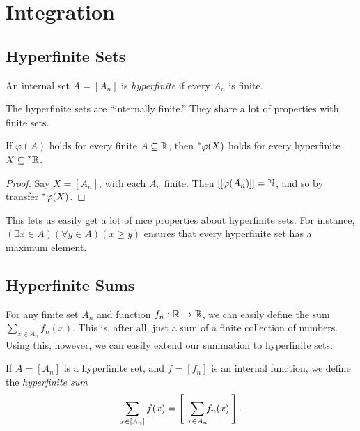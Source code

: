 \section{Integration}
\subsection{Hyperfinite Sets}
\begin{defn}
    An internal set $A = [A_n]$ is \textit{hyperfinite} if every $A_n$ is finite.
\end{defn}

The hyperfinite sets are ``internally finite.'' They share a lot of properties with finite sets.

\begin{thm}\label{HyperfiniteTransfer}
    If $\varphi(A)$ holds for every finite $A \subseteq \mathbb{R}$, then $\prescript{*}{}{\varphi}(X)$ holds for every hyperfinite $X \subseteq \prescript{*}{}{\mathbb{R}}$.
\end{thm}

\begin{proof}
    Say $X = [A_n]$, with each $A_n$ finite. Then $[[\varphi(A_n)]] = \mathbb{N}$, and so by transfer $\prescript{*}{}{\varphi}(X)$.
\end{proof}

This lets us easily get a lot of nice properties about hyperfinite sets. For instance, $(\exists x \in A)(\forall y \in A) (x \geq y)$ ensures that every hyperfinite set has a maximum element.

\subsection{Hyperfinite Sums}
For any finite set $A_n$ and function $f_n: \mathbb{R} \to \mathbb{R}$, we can easily define the sum $\sum_{x \in A_n} f_n(x)$. This is, after all, just a sum of a finite collection of numbers. Using this, however, we can easily extend our summation to hyperfinite sets:

\begin{defn}
    If $A = [A_n]$ is a hyperfinite set, and $f = [f_n]$ is an internal function, we define the \textit{hyperfinite sum}
    \[
    \sum_{x \in [A_n]} f(x) = \left[\ \ \sum_{\mathclap{x \in A_n}} f_n(x) \:\right].
    \] 
\end{defn}

